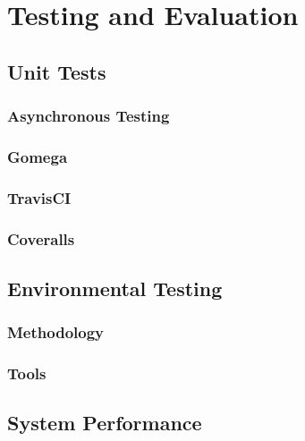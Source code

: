 \section{Testing and Evaluation}
\label{sec:Testing and Evaluation}

\subsection{Unit Tests}
\label{sub:Unit Tests}

\subsubsection{Asynchronous Testing}
\label{subs:Asynchronous Testing}

\subsubsection{Gomega}
\label{subs:Gomega}

\subsubsection{TravisCI}
\label{subs:TravisCI}

\subsubsection{Coveralls}
\label{subs:Coveralls}

\subsection{Environmental Testing}
\label{sub:Environmental Testing}

\subsubsection{Methodology}
\label{subs:Methodology}

\subsubsection{Tools}
\label{subs:Tools}

\subsection{System Performance}
\label{sub:System Performance}
